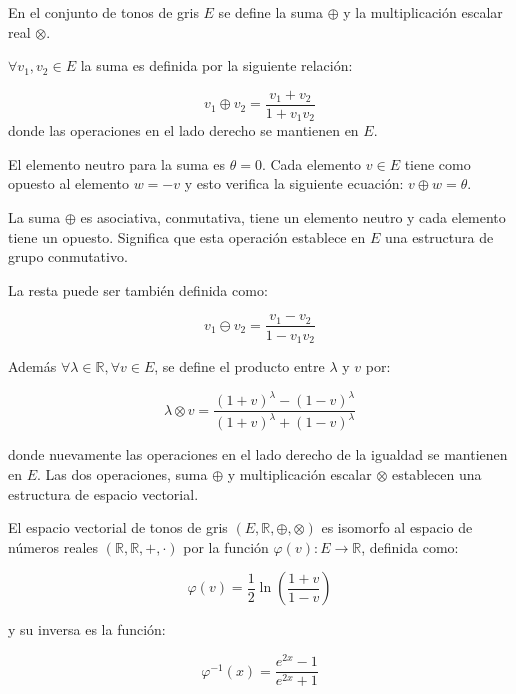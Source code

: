 En el conjunto de tonos de gris $E$ se define la suma $\oplus$ y la multiplicación escalar real $\otimes$.

$\forall v_1,v_2 \in E$ la suma es definida por la siguiente relaci\'on:

\begin{equation}
	v_1 \oplus v_2=\frac{v_1+v_2}{1+v_1v_2}
\end{equation}
donde las operaciones en el lado derecho se mantienen en $E$.

El elemento neutro para la suma es $\theta = 0$. Cada elemento $v \in E$ tiene como opuesto al elemento $w = - v$ y esto verifica la siguiente ecuación: $v \oplus w = \theta$.

La suma $\oplus$ es asociativa, conmutativa, tiene un elemento neutro y cada elemento tiene un opuesto. Significa que esta operación establece en $E$ una estructura de grupo conmutativo.

La resta puede ser tambi\'en definida como:

\begin{equation}
	v_1\ominus v_2=\frac{v_1-v_2}{1-v_1v_2}
\end{equation}

Adem\'as $\forall \lambda \in \mathbb{R}, \forall v \in E $, se define el producto entre $\lambda$ y $v$ por:
 
\begin{equation}
	\lambda \otimes v =\frac{(1+v)^\lambda-(1-v)^\lambda}{(1+v)^\lambda+(1-v)^\lambda}
\end{equation}

donde nuevamente las operaciones en el lado derecho de la igualdad se mantienen en $E$. Las dos operaciones, suma $\oplus$ y multiplicación escalar $\otimes$ establecen una estructura de espacio vectorial.

El espacio vectorial de tonos de gris $(E, \mathbb{R}, \oplus, \otimes)$ es isomorfo al espacio de números reales $(\mathbb{R},\mathbb{R}, +, \cdot)$ por la función $\varphi(v) : E \rightarrow \mathbb{R}$, definida como:

\begin{equation}
	\varphi(v)=\frac{1}{2}\ln\left(\frac{1+v}{1-v}\right)
\end{equation}

y su inversa es la funci\'on:

\begin{equation}
	\varphi^{-1}(x)=\frac{e^{2x}-1}{e^{2x}+1}
\end{equation}

